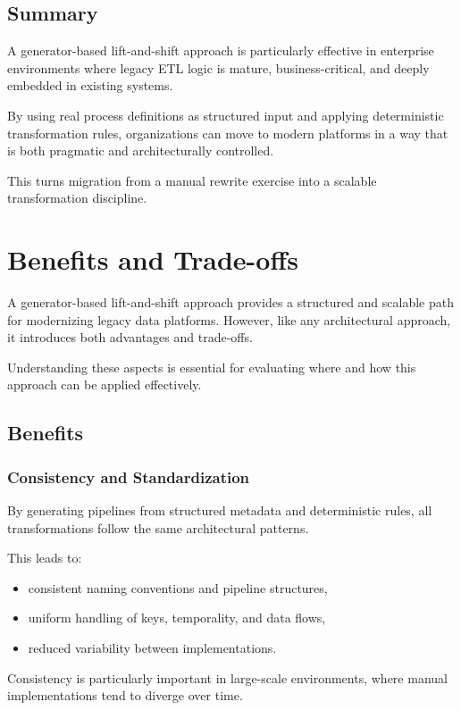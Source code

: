 \documentclass[11pt,a4paper]{article}
\begin{document}
\subsection{Summary}

A generator-based lift-and-shift approach is particularly effective in enterprise environments where legacy ETL logic is mature, business-critical, and deeply embedded in existing systems.

By using real process definitions as structured input and applying deterministic transformation rules, organizations can move to modern platforms in a way that is both pragmatic and architecturally controlled.

This turns migration from a manual rewrite exercise into a scalable transformation discipline.

\section{Benefits and Trade-offs}

A generator-based lift-and-shift approach provides a structured and scalable path for modernizing legacy data platforms. However, like any architectural approach, it introduces both advantages and trade-offs.

Understanding these aspects is essential for evaluating where and how this approach can be applied effectively.

\subsection{Benefits}

\subsubsection{Consistency and Standardization}

By generating pipelines from structured metadata and deterministic rules, all transformations follow the same architectural patterns.

This leads to:
\begin{itemize}
  \item consistent naming conventions and pipeline structures,
  \item uniform handling of keys, temporality, and data flows,
  \item reduced variability between implementations.
\end{itemize}

Consistency is particularly important in large-scale environments, where manual implementations tend to diverge over time.
\end{document}
